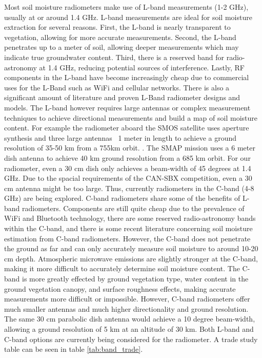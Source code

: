 \documentclass[12pt]{article}
\begin{document}
Most soil moisture radiometers make use of L-band measurements (1-2 GHz), usually at or around 1.4 GHz. L-band measurements are ideal for soil moisture extraction for several reasons. First, the L-band is nearly transparent to vegetation, allowing for more accurate measurements. Second, the L-band penetrates up to a meter of soil, allowing deeper measurements which may indicate true groundwater content. Third, there is a reserved band for radio-astronomy at 1.4 GHz, reducing potential sources of interference. Lastly, RF components in the L-band have become increasingly cheap due to commercial uses for the L-Band such as WiFi and cellular networks. There is also a significant amount of literature and proven L-Band radiometer designs and models. The L-band however requires large antennas or complex measurement techniques to achieve directional measurements and build a map of soil moisture content. For example the radiometer aboard the SMOS satellite uses aperture synthesis and three large antennas ~1 meter in length to achieve a ground resolution of 35-50 km from a 755km orbit. \cite{Wigneron2010}. The SMAP mission uses a 6 meter dish antenna to achieve 40 km ground resolution from a 685 km orbit. \cite{entekhabi_njoku_oneill_spencer_jackson_entin_im_kellogg_2008}  For our radiometer, even a 30 cm dish only achieves a beam-width of 45 degrees at 1.4 GHz. Due to the spacial requirements of the CAN-SBX competition, even a 30 cm antenna might be too large. Thus, currently radiometers in the C-band (4-8 GHz) are being explored. C-band radiometers share some of the benefits of L-band radiometers. Components are still quite cheap due to the prevalence of WiFi and Bluetooth technology, there are some reserved radio-astronomy bands within the C-band, and there is some recent literature concerning soil moisture estimation from C-band radiometers. \cite{Description2000,jackson_gasiewski_oldak_klein_njoku_yevgrafov_christiani_bindlish_2002} However, the C-band does not penetrate the ground as far and can only accurately measure soil moisture to around 10-20 cm depth. Atmospheric microwave emissions are slightly stronger at the C-band, making it more difficult to accurately determine soil moisture content. The C-band is more greatly effected by ground vegetation type, water content in the ground vegetation canopy, and surface roughness effects, making accurate measurements more difficult or impossible. \cite{ulaby_fung_moore_1986} However, C-band radiometers offer much smaller antennas and much higher directionality and ground resolution. The same 30 cm parabolic dish antenna would achieve a 10 degree beam-width, allowing a ground resolution of 5 km at an altitude of 30 km. Both L-band and C-band options are currently being considered for the radiometer. A trade study table can be seen in table \ref{tab:band_trade}.
\end{document}
